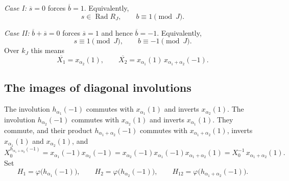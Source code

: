 \documentclass[]{jgcc}
\DeclareMathOperator{\Rad}{Rad}
\numberwithin{equation}{section}
\begin{document}
\smallskip
\noindent\emph{Case I:} $\overline{s}=0$ forces $\overline{b}=1$.
Equivalently,
\[
s\in\Rad R_J,\qquad b\equiv 1\pmod J.
\]

\smallskip
\noindent\emph{Case II:} $\overline{b}+\overline{s}=0$ forces $\overline{s}=1$ and hence $\overline{b}=-1$.
Equivalently,
\[
s\equiv 1\pmod J,\qquad b\equiv -1\pmod J.
\]
Over $k_J$ this means
\[
\overline{X_1}=x_{\alpha_2}(1),\qquad
\overline{X_2}=x_{\alpha_1}(1)\,x_{\alpha_1+\alpha_2}(-1).
\]

\subsection{The images of diagonal involutions}\label{subsec:diag-invol}

The involution $h_{\alpha_1}(-1)$ commutes with $x_{\alpha_1}(1)$ and inverts $x_{\alpha_2}(1)$.
The involution $h_{\alpha_2}(-1)$ commutes with $x_{\alpha_2}(1)$ and inverts $x_{\alpha_1}(1)$.
They commute, and their product $h_{\alpha_1+\alpha_2}(-1)$ commutes with $x_{\alpha_1+\alpha_2}(1)$, inverts $x_{\alpha_1}(1)$ and $x_{\alpha_2}(1)$, and
\[
X_0^{h_{\alpha_1+\alpha_2}(-1)}
= x_{\alpha_1}(-1)x_{\alpha_2}(-1)
= x_{\alpha_2}(-1)x_{\alpha_1}(-1)x_{\alpha_1+\alpha_2}(1)
= X_0^{-1}\,x_{\alpha_1+\alpha_2}(1).
\]
Set
\[
H_1=\varphi\bigl(h_{\alpha_1}(-1)\bigr),\qquad
H_2=\varphi\bigl(h_{\alpha_2}(-1)\bigr),\qquad
H_{12}=\varphi\bigl(h_{\alpha_1+\alpha_2}(-1)\bigr).
\]
\end{document}
